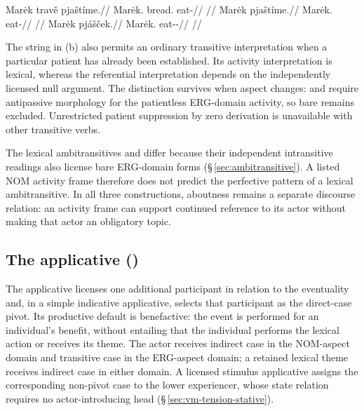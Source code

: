\pex\label{ex:nom-activity-eat}
\a
\begingl
\gla Marėk travě pjaštíme.//
\glb Marėk.\Dir{} bread.\Ind{} eat-\Prog{}//
\glft {}
//
\endgl
\a
\begingl
\gla Marėk pjaštíme.//
\glb Marėk.\Dir{} eat-\Prog{}//
\glft {}
//
\endgl
\a
\begingl
\gla Marėk pjášček.//
\glb Marėk.\Dir{} eat-\Antip{}-\Pf{}//
\glft {}
//
\endgl
\xe

The string in (b) also permits an ordinary transitive interpretation when a
particular patient has already been established. Its activity interpretation
is lexical, whereas the referential interpretation depends on the independently
licensed null argument. The distinction survives when aspect changes:
 and  require antipassive morphology for the
patientless ERG-domain activity, so bare  remains excluded.
Unrestricted patient suppression by zero derivation is unavailable with other
transitive verbs.

The lexical ambitransitives  and  differ because their
independent intransitive readings also license bare ERG-domain forms
(§\,\ref{sec:ambitransitive}). A listed NOM activity frame therefore does
not predict the perfective pattern of a lexical ambitransitive. In all three
constructions, aboutness remains a separate discourse relation: an activity
frame can support continued reference to its actor without making that actor
an obligatory topic.

\subsection{The applicative ()}\label{sec:vm-appl}

The applicative  licenses one additional participant in relation to
the eventuality and, in a simple indicative applicative, selects that participant as
the direct-case pivot. Its productive default is benefactive: the event is
performed for an individual's benefit, without entailing that the individual
performs the lexical action or receives its theme. The actor receives indirect
case in the NOM-aspect domain and transitive case in the ERG-aspect domain;
a retained lexical theme receives indirect case in either domain. A licensed
stimulus applicative assigns the corresponding non-pivot case to the lower
experiencer, whose state relation requires no actor-introducing head
(§\,\ref{sec:vm-tension-stative}).


